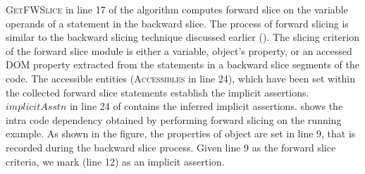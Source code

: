 \textsc{GetFWSlice} in line 17 of the algorithm computes forward slice on the variable operands of a statement in the backward slice.
The process of forward slicing is similar to the backward slicing technique discussed earlier (). The slicing criterion of the forward slice module is either a variable, object's property, or an accessed DOM property extracted from the statements in a backward slice segments of the code. The accessible entities (\textsc{Accessibles} in line 24), which have been set within the collected forward slice statements establish the implicit assertions.
$implicitAsstn$ in line 24 of  contains the inferred implicit assertions.
 shows the intra code dependency obtained by performing forward slicing on the running example. 
As shown in the figure, the properties of object  are set in line 9, that is recorded during the backward slice process. Given line 9 as the forward slice criteria, we mark  (line 12) as an implicit assertion.        